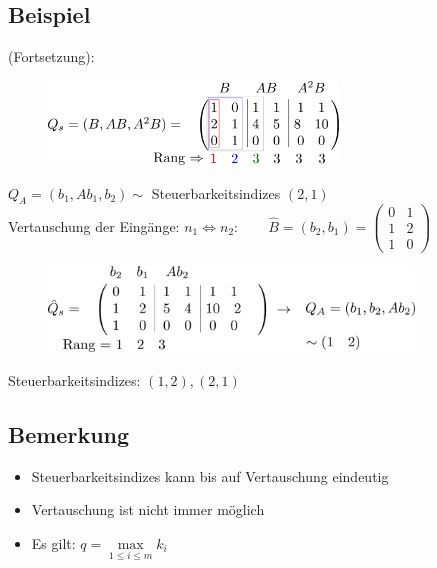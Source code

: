 \documentclass[ngerman]{tudscrreprt}
\begin{document}
\subsection*{Beispiel} (Fortsetzung):
\begin{figure}[H]
\centering
\def\svgwidth{200pt} 
  \includegraphics[width=7.7cm]{images/Zeichnung1.pdf}
\end{figure}

$Q_A = (b_1,Ab_1,b_2) \sim$ Steuerbarkeitsindizes $(2,1)$ \\ 
Vertauschung der Eingänge: $n_1 \iff n_2: \qquad \hat{B} = (b_2,b_1) = \begin{pmatrix} 0&1\\1&2\\1&0 \end{pmatrix}$  
\begin{figure}[H]
\centering
\def\svgwidth{200pt} 
  \includegraphics[width=9.7cm]{images/Zeichnung2.pdf}
\end{figure}
Steuerbarkeitsindizes: $(1,2), (2,1)$
\subsection*{Bemerkung}
\begin{itemize}
\item Steuerbarkeitsindizes kann bis auf Vertauschung eindeutig 
\item Vertauschung ist nicht immer möglich
\item Es gilt: $q = \max\limits_{1\le i\le m} k_i$
\end{itemize}
\end{document}
